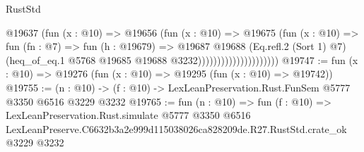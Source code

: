 \begin{lexlean}{RustStd}
\begin{coremodule}
                                    @19637
                                      (fun (x : @10) =>
                                      @19656
                                        (fun (x : @10) =>
                                        @19675
                                          (fun (x : @10) =>
                                          fun (fn : @7) =>
                                          fun (h : @19679) =>
                                          @19687
                                            @19688
                                            (Eq.refl.{2} (Sort 1) @7)
                                            (heq_of_eq.{1}
                                              @5768
                                              @19685
                                              @19688
                                              @3232)))))))))))))))))))))
@19747 := fun (x : @10) => @19276 (fun (x : @10) => @19295 (fun (x : @10) => @19742))
@19755 := (n : @10) -> (f : @10) -> LexLeanPreservation.Rust.FunSem @5777 @3350 @6516 @3229 @3232
@19765 := fun (n : @10) =>
  fun (f : @10) =>
  LexLeanPreservation.Rust.simulate
    @5777
    @3350
    @6516
    LexLeanPreserve.C6632b3a2e999d115038026ca828209de.R27.RustStd.crate_ok
    @3229
    @3232
\end{coremodule}
\end{lexlean}
